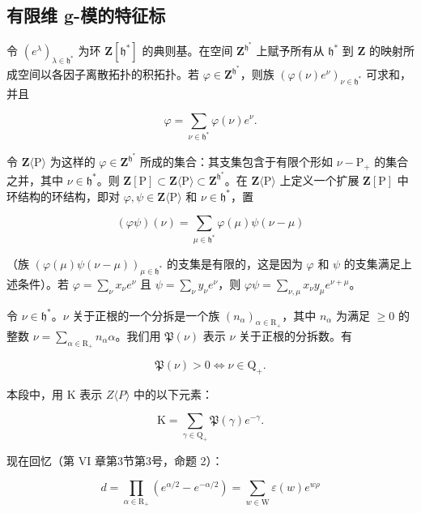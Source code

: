 \subsection{有限维 g-模的特征标}

令 \((e^{\lambda})_{\lambda \in \mathfrak{h}^{*}}\) 为环 \(\mathbf{Z}[\mathfrak{h}^*]\) 的典则基。在空间 \(\mathbf{Z}^{\mathfrak{h}^*}\) 上赋予所有从 \(\mathfrak{h}^*\) 到 \(\mathbf{Z}\) 的映射所成空间以各因子离散拓扑的积拓扑。若 \(\varphi \in \mathbf{Z}^{\mathfrak{h}^*}\)，则族 \((\varphi (\nu)e^{\nu})_{\nu \in \mathfrak{h}^*}\) 可求和，并且

\[
\varphi = \sum_ {\nu \in \mathfrak {h} ^ {*}} \varphi (\nu) e ^ {\nu}.
\]

令 \(\mathbf{Z}\langle\mathrm{P}\rangle\) 为这样的 \(\varphi\in\mathbf{Z}^{\mathfrak{h}^{*}}\) 所成的集合：其支集包含于有限个形如 \(\nu-\mathrm{P}_{+}\) 的集合之并，其中 \(\nu\in\mathfrak{h}^{*}\)。则 \(\mathbf{Z}[\mathrm{P}]\subset\mathbf{Z}\langle\mathrm{P}\rangle\subset\mathbf{Z}^{\mathfrak{h}^{*}}\)。在 \(\mathbf{Z}\langle\mathrm{P}\rangle\) 上定义一个扩展 \(\mathbf{Z}[\mathrm{P}]\) 中环结构的环结构，即对 \(\varphi,\psi\in\mathbf{Z}\langle\mathrm{P}\rangle\) 和 \(\nu\in\mathfrak{h}^{*}\)，置

\[
(\varphi \psi) (\nu) = \sum_ {\mu \in \mathfrak {h} ^ {*}} \varphi (\mu) \psi (\nu - \mu)
\]

（族 \((\varphi(\mu)\psi(\nu - \mu))_{\mu \in \mathfrak{h}^*}\) 的支集是有限的，这是因为 \(\varphi\) 和 \(\psi\) 的支集满足上述条件）。若 \(\varphi = \sum_{\nu} x_{\nu} e^{\nu}\) 且 \(\psi = \sum_{\nu} y_{\nu} e^{\nu}\)，则 \(\varphi \psi = \sum_{\nu, \mu} x_{\nu} y_{\mu} e^{\nu + \mu}\)。

令 \(\nu \in \mathfrak{h}^*\)。\(\nu\) 关于正根的一个分拆是一个族 \((n_{\alpha})_{\alpha \in \mathrm{R}_{+}}\)，其中 \(n_{\alpha}\) 为满足 \(\geq 0\) 的整数 \(\nu = \sum_{\alpha \in \mathrm{R}_{+}} n_{\alpha} \alpha\)。我们用 \(\mathfrak{P}(\nu)\) 表示 \(\nu\) 关于正根的分拆数。有

\[
\mathfrak {P} (\nu) > 0 \Longleftrightarrow \nu \in \mathrm{Q} _ {+}.
\]

本段中，用 K 表示 \(Z\langle P\rangle\) 中的以下元素：

\[
\mathrm{K} = \sum_ {\gamma \in \mathrm{Q} _ {+}} \mathfrak {P} (\gamma) e ^ {- \gamma}.
\]

现在回忆（第 VI 章第3节第3号，命题 2）：

\[
d = \prod_ {\alpha \in \mathrm{R} _ {+}} (e ^ {\alpha / 2} - e ^ {- \alpha / 2}) = \sum_ {w \in \mathrm{W}} \varepsilon (w) e ^ {w \rho}
\]

